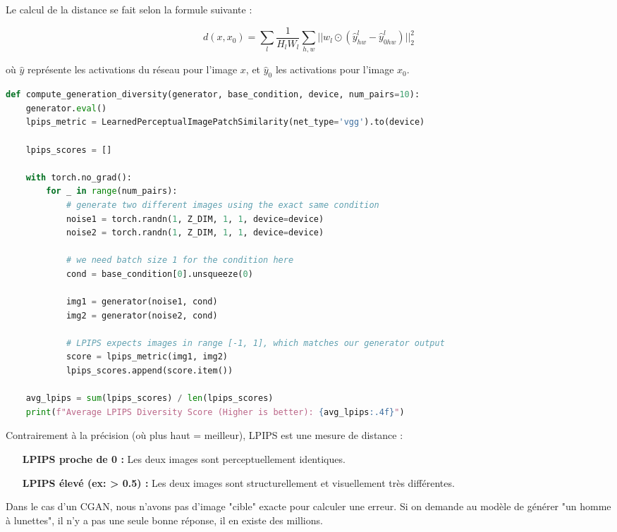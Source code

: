 \documentclass{article}
\begin{document}
\noindent Le calcul de la distance se fait selon la formule suivante :

$$d(x, x_0) = \sum_{l} \frac{1}{H_l W_l} \sum_{h, w} || w_l \odot (\hat{y}_{hw}^l - \hat{y}_{0hw}^l) ||_2^2$$

\noindent où $\hat{y}$ représente les activations du réseau pour l'image $x$, et $\hat{y}_0$ les activations pour l'image $x_0$.

\medskip
\begin{lstlisting}[language=Python, caption={Algo de score LPIPS}]
def compute_generation_diversity(generator, base_condition, device, num_pairs=10):
    generator.eval()
    lpips_metric = LearnedPerceptualImagePatchSimilarity(net_type='vgg').to(device)
    
    lpips_scores = []
    
    with torch.no_grad():
        for _ in range(num_pairs):
            # generate two different images using the exact same condition
            noise1 = torch.randn(1, Z_DIM, 1, 1, device=device)
            noise2 = torch.randn(1, Z_DIM, 1, 1, device=device)
            
            # we need batch size 1 for the condition here
            cond = base_condition[0].unsqueeze(0)
            
            img1 = generator(noise1, cond)
            img2 = generator(noise2, cond)
            
            # LPIPS expects images in range [-1, 1], which matches our generator output
            score = lpips_metric(img1, img2)
            lpips_scores.append(score.item())
            
    avg_lpips = sum(lpips_scores) / len(lpips_scores)
    print(f"Average LPIPS Diversity Score (Higher is better): {avg_lpips:.4f}")
\end{lstlisting}

Contrairement à la précision (où plus haut = meilleur), LPIPS est une mesure de distance :
\begin{itemize}
    \item[\textbf{LPIPS proche de 0 :}] Les deux images sont perceptuellement identiques.
    \item[\textbf{LPIPS élevé (ex: > 0.5) :}] Les deux images sont structurellement et visuellement très différentes.
\end{itemize}

\medskip

Dans le cas d'un CGAN, nous n'avons pas d'image "cible" exacte pour calculer une erreur. Si on demande au modèle de générer "un homme à lunettes", il n'y a pas une seule bonne réponse, il en existe des millions.
\end{document}
